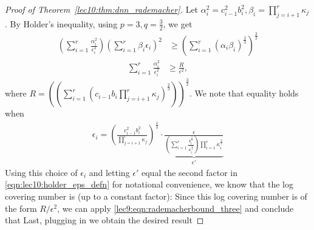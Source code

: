 \begin{proof}[Proof of Theorem~\ref{lec10:thm:dnn_rademacher}]
	Let $\alpha_i^2 = c_{i-1}^2b_i^2, \beta_i = \prod_{j=i+1}^{r}\kappa_j$. By Holder's inequality, using $p = 3, q = \frac{3}{2}$, we get
	\begin{align}
	\left(\sum_{i=1}^{r}\frac{\alpha_i^2}{\epsilon_i^2}\right)\left(\sum_{i=1}^{r}\beta_i\epsilon_i\right)^2 &\geq \left(\sum_{i=1}^{r}\left(\alpha_i\beta_i\right)^{\frac{2}{3}}\right)^{\frac{3}{2}}
	\end{align}
	\begin{align}
	\sum_{i=1}^{r}\frac{\alpha_i^2}{\epsilon_i^2} &\geq \frac{R}{\epsilon^2},
	\end{align}
	where $R = \left(\left(\sum_{i=1}^{r}\left(c_{i-1}b_i\prod_{j=i+1}^{r}\kappa_j\right)^{\frac{2}{3}}\right)\right)^{\frac{3}{2}}$. We note that equality holds when 
	\begin{align}
	\epsilon_i = \left(\frac{c_{i-1}^2b_i^2}{\prod_{j=i+1}^{r}\kappa_j}\right)^{\frac{1}{3}} \cdot \underbrace{\frac{\epsilon}{\left(\sum_{i=1}^{r}\frac{b_i^{\frac{2}{3}}}{\kappa_i^{\frac{2}{3}}}\right)\prod_{i=1}^{r}\kappa_i^{\frac{2}{3}} }}_{\epsilon'} \label{eqn:lec10:holder_eps_defn}
	\end{align}
	Using this choice of $\epsilon_i$ and letting $\epsilon'$ equal the second factor in \eqref{eqn:lec10:holder_eps_defn} for notational convenience, we know that the log covering number is (up to a constant factor):
	Since this log covering number is of the form $R / \epsilon^2$, we can apply \eqref{lec9:eqn:rademacherbound_three} and conclude that
	Last, plugging in
	we obtain the desired result
	
\end{proof}


